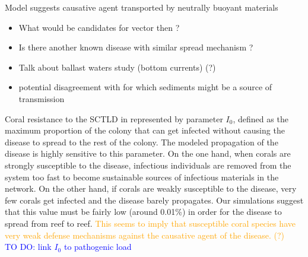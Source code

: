 \documentclass[utf8]{frontiersSCNS}
\begin{document}
Model suggests causative agent transported by neutrally buoyant materials
\begin{itemize}
    \item What would be candidates for vector then ?
    \item Is there another known disease with similar spread mechanism ?
    \item Talk about ballast waters study (bottom currents) (?)
    \item potential disagreement with \citep{rosales2020rhodobacterales} for which sediments might be a source of transmission  
\end{itemize}

Coral resistance to the SCTLD in represented by parameter $I_0$, defined as the maximum proportion of the colony that can get infected without causing the disease to spread to the rest of the colony. The modeled propagation of the disease is highly sensitive to this parameter. On the one hand, when corals are strongly susceptible to the disease, infectious individuals are removed from the system too fast to become sustainable sources of infectious materials in the network. On the other hand, if corals are weakly susceptible to the disease, very few corals get infected and the disease barely propagates. Our simulations suggest that this value must be fairly low (around 0.01\%) in order for the disease to spread from reef to reef. \textcolor{orange}{This seems to imply that susceptible coral species have very weak defense mechanisms against the causative agent of the disease. (?)} \\
\textcolor{blue}{TO DO: link $I_0$ to pathogenic load}



\end{document}
